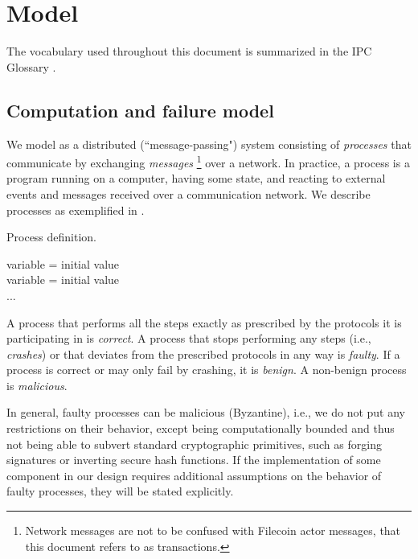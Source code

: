 \section{Model}
\label{sec:model}

The vocabulary used throughout this document is summarized in the IPC Glossary \cite{glossary}.


\subsection{Computation and failure model}

We model \ipc as a distributed (``message-passing") system consisting of \emph{processes} that communicate by exchanging \emph{messages}%
\footnote{Network messages are not to be confused with Filecoin actor messages, that this document refers to as transactions.}
over a network. 
In practice, a process is a program running on a computer, having some state, and reacting to external events and messages received over a communication network.
We describe processes as exemplified in .

\begin{algorithm}[H]
\footnotesize
\caption{Process definition.}\label{alg:process-definition}
  \DontPrintSemicolon
  variable = initial value\\
  variable = initial value\\
  ...\\
\end{algorithm}

A process that performs all the steps exactly as prescribed by the protocols it is participating in is \emph{correct}.
A process that stops performing any steps (i.e., \emph{crashes}) or that deviates from the prescribed protocols in any way is \emph{faulty}.
If a process is correct or may only fail by crashing, it is \emph{benign}.
A non-benign process is \emph{malicious}.

In general, faulty processes can be malicious (Byzantine), i.e., we do not put any restrictions on their behavior, except being computationally bounded and thus not being able to subvert standard cryptographic primitives, such as forging signatures or inverting secure hash functions.
If the implementation of some component in our design requires additional assumptions on the behavior of faulty processes, they will be stated explicitly.

